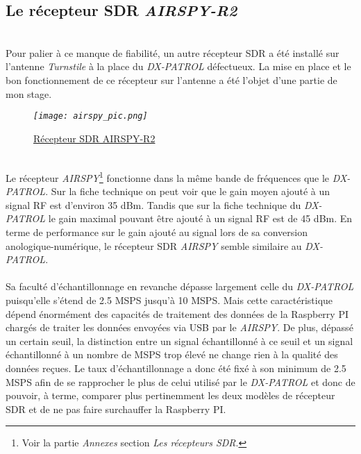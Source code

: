 \documentclass[12pt,fleqn]{book} %
\begin{document}
\subsection{Le récepteur SDR \emph{AIRSPY-R2}}
~\\Pour palier à ce manque de fiabilité, un autre récepteur SDR a été installé sur l'antenne \emph{Turnstile} à la place du \emph{DX-PATROL} défectueux. La mise en place et le bon fonctionnement de ce récepteur sur l'antenne a été l'objet d'une partie de mon stage.
\begin{figure}[H]
	\centering
	\itshape
	\texttt{[image: airspy\_pic.png]}
	\caption{\label{airspy_pic} \underline{Récepteur SDR AIRSPY-R2}}
\end{figure}
~\\Le récepteur \emph{AIRSPY}\footnote{Voir la partie \emph{Annexes} section \emph{Les récepteurs SDR}.} fonctionne dans la même bande de fréquences que le \emph{DX-PATROL}. Sur la fiche technique on peut voir que le gain moyen ajouté à un signal RF est d'environ 35 dBm. Tandis que sur la fiche technique du \emph{DX-PATROL} le gain maximal pouvant être ajouté à un signal RF est de 45 dBm.
En terme de performance sur le gain ajouté au signal lors de sa conversion anologique-numérique, le récepteur SDR \emph{AIRSPY} semble similaire au \emph{DX-PATROL}.
~\\\\Sa faculté d'échantillonnage en revanche dépasse largement celle du \emph{DX-PATROL} puisqu'elle s'étend de 2.5 MSPS jusqu'à 10 MSPS. Mais cette caractéristique dépend énormément des capacités de traitement des données de la Raspberry PI chargés de traiter les données envoyées via USB par le \emph{AIRSPY}. De plus, dépassé un certain seuil, la distinction entre un signal échantillonné à ce seuil et un signal échantillonné à un nombre de MSPS trop élevé ne change rien à la qualité des données reçues.
Le taux d'échantillonnage a donc été fixé à son minimum de 2.5 MSPS afin de se rapprocher le plus de celui utilisé par le \emph{DX-PATROL} et donc de pouvoir, à terme, comparer plus pertinemment les deux modèles de récepteur SDR et de ne pas faire surchauffer la Raspberry PI.
\end{document}
